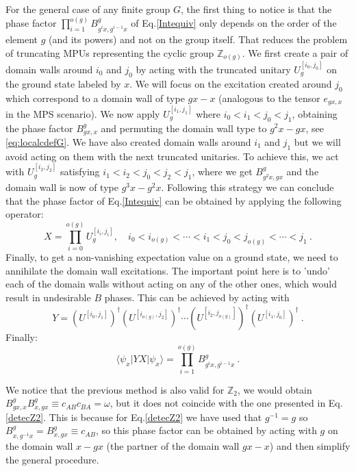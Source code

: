 \documentclass[aps,pra,export,nofootinbib]{revtex4-2}
\begin{document}
For the general case of any finite group $G$, the first thing to notice is that the phase factor $\prod_{i=1}^{o(g)} B^{g}_{ g^{i}x, {g^{i-1}x}} $ of Eq.\eqref{Intequiv} only depends on the order of the element $g$ (and its powers) and not on the group itself. That reduces the problem of truncating MPUs representing the cyclic group $\mathbb{Z}_{o(g)}$. We first create a pair of domain walls around $i_0$ and $j_0$ by acting with the truncated unitary $U_g^{[i_0,j_0]}$ on the ground state labeled by $x$. We will focus on the excitation created around $j_0$ which correspond to a domain wall of type $gx-x$ (analogous to the tensor $e_{gx,x}$ in the MPS scenario). We now apply $U_g^{[i_1,j_1]}$ where $i_0 < i_1 < j_0 < j_1$, obtaining the phase factor $B^g_{gx,x}$ and permuting the domain wall type to $g^2x-gx$, see \eqref{eq:localcdefG}. We have also created domain walls around $i_1$ and $j_1$ but we will avoid acting on them with the next truncated unitaries. To achieve this, we act with $U_g^{[i_2,j_2]}$ satisfying $i_1 < i_2 < j_0 < j_2 < j_1$, where we get $B^g_{g^2x,gx}$ and the domain wall is now of type $g^3x-g^2x$. Following this strategy we can conclude that the phase factor of Eq.\eqref{Intequiv} can be obtained by applying the following operator: 
$$X = \prod_{i=0} ^{o(g)}U_g^{[i_i,j_i]}, \quad i_0<i_{o(g)}<\cdots < i_1 < j_0 < j_{o(g)}< \cdots <j_1 \ .$$
Finally, to get a non-vanishing expectation value on a ground state, we need to annihilate the domain wall excitations. The important point here is to 'undo' each of the domain walls without acting on any of the other ones, which would result in undesirable $B$ phases. This can be achieved by acting with 
$$ Y = (U^{[i_0,j_1]})^\dagger (U^{[i_{o(g)},j_2]})^\dagger \cdots (U^{[i_2,j_{o(g)}]})^\dagger (U^{[i_1,j_{0}]})^\dagger \ .$$
Finally:
\begin{equation}\label{detectG}
\langle\psi_x\vert Y X \vert\psi_x\rangle = \prod_{i=1}^{o(g)} B^{g}_{ g^{i}x, {g^{i-1}x}} \ .
\end{equation}

We notice that the previous method is also valid for $\mathbb{Z}_2$, we would obtain $B^{g}_{ gx, {x}}B^{g}_{ x, {gx}} \equiv c_{AB}c_{BA}= \omega$, but it does not coincide with the one presented in Eq.\eqref{detecZ2}. This is because for Eq.\eqref{detecZ2} we have used that $g^{-1} = g$ so $B^{g}_{ x, {g^{-1}x}} =  B^{g}_{ x, {gx}} \equiv c_{AB} $, so this phase factor can be obtained by acting with $g$ on the domain wall $x-gx$ (the partner of the domain wall $gx-x$) and then simplify the general procedure.
\end{document}
